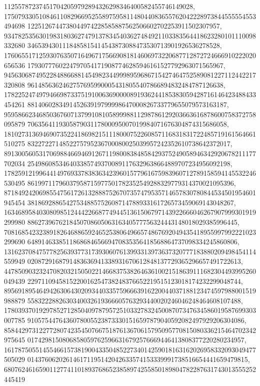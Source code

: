 \documentclass[12pt]{article}
\begin{document}
112557872374517042059792894326298346400582455746149028, 
175079330510846110829669525589759581148044083655762042228973844555554553494698
1225126744738044974228585887562506602702253911502307957, 
934782535630198318036274791378345403627484921103383564418623280101110098332680
3465394301118485815414543873088473530713901926536278528, 
176065517125930763507164967175669081814606973220687712872724666910222020656536
17930777602247970541719087746285946161527792963071565967, 
945630687495228488668814549823449998959686715427464752589081227112442217320808
96148563624627576959900054318055407866894832484787126638, 
178225247497946698733751910063690000891936244185383059428716146423488433454261
881406028349145263919799998647000826733779655079573163187, 
959586623468503676071379910810589998811298786129203663616878600758372758095879
706356411930587903117800095007019984071676304874315686058, 
181027313694690735224186982151118000752260857116831831722485719161564661510275
8322722714852275795236700080025039957242352610738642372017, 
891300560531706988466946912671198008384858429375249058946342920678211177702034
2549860853464033857493700891176329638664889707234956092198, 
178259121996441497693378383634239601577961675983960712789158594145532246530495
86199711796037958715977501782352549288329779314370021095396, 
871849242069855475617261328887526707357479535714657830780844534501954601945454
38186928865427534885752608714788933161726573459069143048267, 
163468958403080985124442266877494451361506797143922666046267907999301919299980
886273967621845070860506316340577756324443148018029385996445, 
708168542323891826468865924652538064966574867692049435418955997992221023299690
648914633851186868465669470835356418568864737098334245860806, 
131623708475778256393773173930607613993313973637320777183880209498454114559949
0208729168791483636941338931670612848137729365296657491722613, 
447850903232470820321505022146683753826463610021518639111682304493995260049439
2297110945815220016254738248376652219515123018174232299048744, 
895691895464942630643020934403357596663916220044037188123474597988001519988879
5583222882630340032619366605763293440020246046248464608107488, 
178039370192978527128504097879572510332783245008707347634586019587699303007785
91057544764360780055238733301516597879040592082497929206304086, 
858442973122772807423545076675187613670615795095770815080336215464702342975645
01742981508068580597625966316792576669446413808377220280234957, 
161787505514554661573819004335048522734014259018163162026958332093049477505029
014376062026146171195142042633574153339991738516654441659479815, 
680762461659011277411018937686523858974255850189804782287631743013555252445419
\end{document}
